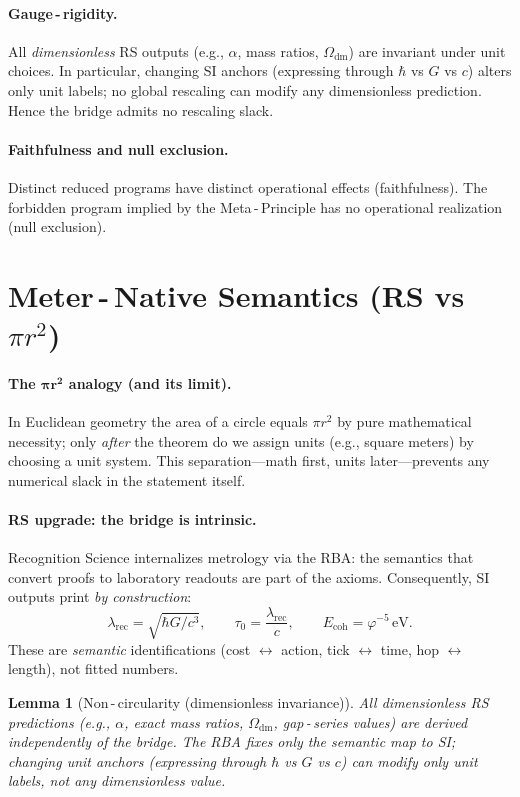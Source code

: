 \documentclass[11pt]{article}
\newcommand{\ph}{\varphi}
\newcommand{\lamrec}{\lambda_{\mathrm{rec}}}
\newcommand{\tauzero}{\tau_{0}}
\newcommand{\Ecoh}{E_{\mathrm{coh}}}
\newtheorem{lemma}[theorem]{Lemma}
\theoremstyle{remark}
\begin{document}
\paragraph{Gauge\,\mbox{-}\,rigidity.}
All \emph{dimensionless} RS outputs (e.g., $\alpha$, mass ratios, $\Omega_{\mathrm{dm}}$) are invariant under unit choices.
In particular, changing SI anchors (expressing through $\hbar$ vs $G$ vs $c$) alters only unit labels; no global rescaling can modify any dimensionless prediction. Hence the bridge admits no rescaling slack.

\paragraph{Faithfulness and null exclusion.}
Distinct reduced programs have distinct operational effects (faithfulness). The forbidden program implied by the Meta\,\mbox{-}\,Principle has no operational realization (null exclusion).

\section{Meter\,\mbox{-}\,Native Semantics (RS vs \texorpdfstring{$\pi r^{2}$}{pi r^2})}
\paragraph{The $\boldsymbol{\pi r^{2}}$ analogy (and its limit).}
In Euclidean geometry the area of a circle equals $\pi r^{2}$ by pure mathematical necessity; only \emph{after} the theorem do we assign units (e.g., square meters) by choosing a unit system. This separation---math first, units later---prevents any numerical slack in the statement itself.

\paragraph{RS upgrade: the bridge is intrinsic.}
Recognition Science internalizes metrology via the RBA: the semantics that convert proofs to laboratory readouts are part of the axioms. Consequently, SI outputs print \emph{by construction}:
\[
  \lamrec = \sqrt{\hbar G / c^{3}}, \qquad
  \tauzero = \frac{\lamrec}{c}, \qquad
  \Ecoh = \ph^{-5}\,\mathrm{eV}.
\]
These are \emph{semantic} identifications (cost $\leftrightarrow$ action, tick $\leftrightarrow$ time, hop $\leftrightarrow$ length), not fitted numbers.

\begin{lemma}[Non\,\mbox{-}\,circularity (dimensionless invariance)]
All dimensionless RS predictions (e.g., $\alpha$, exact mass ratios, $\Omega_{\mathrm{dm}}$, gap\,\mbox{-}\,series values) are derived independently of the bridge. The RBA fixes only the semantic map to SI; changing unit anchors (expressing through $\hbar$ vs $G$ vs $c$) can modify \emph{only} unit labels, not any dimensionless value.
\end{lemma}
\end{document}
